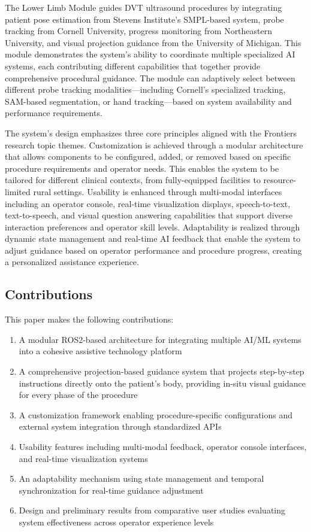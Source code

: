 \documentclass[12pt,a4paper]{article}
\begin{document}
The Lower Limb Module guides DVT ultrasound procedures by integrating patient pose estimation from Stevens Institute's SMPL-based system, probe tracking from Cornell University, progress monitoring from Northeastern University, and visual projection guidance from the University of Michigan. This module demonstrates the system's ability to coordinate multiple specialized AI systems, each contributing different capabilities that together provide comprehensive procedural guidance. The module can adaptively select between different probe tracking modalities—including Cornell's specialized tracking, SAM-based segmentation, or hand tracking—based on system availability and performance requirements.

The system's design emphasizes three core principles aligned with the Frontiers research topic themes. Customization is achieved through a modular architecture that allows components to be configured, added, or removed based on specific procedure requirements and operator needs. This enables the system to be tailored for different clinical contexts, from fully-equipped facilities to resource-limited rural settings. Usability is enhanced through multi-modal interfaces including an operator console, real-time visualization displays, speech-to-text, text-to-speech, and visual question answering capabilities that support diverse interaction preferences and operator skill levels. Adaptability is realized through dynamic state management and real-time AI feedback that enable the system to adjust guidance based on operator performance and procedure progress, creating a personalized assistance experience.

\subsection{Contributions}

This paper makes the following contributions:

\begin{enumerate}
    \item A modular ROS2-based architecture for integrating multiple AI/ML systems into a cohesive assistive technology platform
    \item A comprehensive projection-based guidance system that projects step-by-step instructions directly onto the patient's body, providing in-situ visual guidance for every phase of the procedure
    \item A customization framework enabling procedure-specific configurations and external system integration through standardized APIs
    \item Usability features including multi-modal feedback, operator console interfaces, and real-time visualization systems
    \item An adaptability mechanism using state management and temporal synchronization for real-time guidance adjustment
    \item Design and preliminary results from comparative user studies evaluating system effectiveness across operator experience levels
\end{enumerate}
\end{document}

